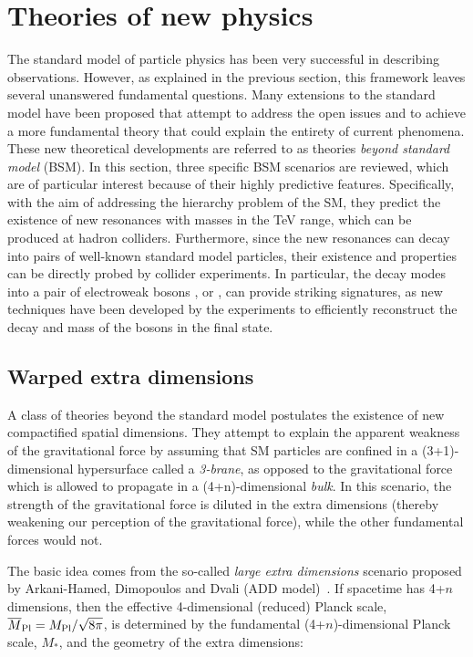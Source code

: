 \section{Theories of new physics}
\label{sec:BSMintro}

The standard model of particle physics has been very successful in describing observations. 
However, as explained in the previous section, this framework leaves several unanswered fundamental questions.
Many extensions to the standard model have been proposed that attempt to address the open issues and to achieve a more fundamental theory
that could explain the entirety of current phenomena.
These new theoretical developments are referred to as theories \textit{beyond standard model} (BSM).
In this section, three specific BSM scenarios are reviewed, which are of particular interest because of their highly predictive features.
Specifically, with the aim of addressing the hierarchy problem of the SM, they predict the existence of new resonances with masses in the TeV range,
which can be produced at hadron colliders.
Furthermore, since the new resonances can decay into pairs of well-known standard model particles, their existence and properties can be directly probed by collider experiments.
In particular, the decay modes into a pair of electroweak bosons \PW, \PZ or \PH, can provide striking signatures, as new techniques have been developed by the experiments to efficiently reconstruct the decay and mass of the bosons in the final state.

\subsection{Warped extra dimensions}\label{subsec:graviton}

A class of theories beyond the standard model postulates the existence of new compactified spatial dimensions.
They attempt to explain the apparent weakness of the gravitational force by assuming that SM particles are confined in a (3+1)-dimensional hypersurface called a \textit{3-brane},
as opposed to the gravitational force which is allowed to propagate in a (4+n)-dimensional \textit{bulk}.
In this scenario, the strength of the gravitational force is diluted in the extra dimensions (thereby weakening our perception of the gravitational force), while the other fundamental forces would not.

The basic idea comes from the so-called \textit{large extra dimensions} scenario proposed by Arkani-Hamed, Dimopoulos and Dvali (ADD model)~\cite{ArkaniHamed:1998rs}.
If spacetime has 4+$n$ dimensions, then the effective 4-dimensional (reduced) Planck scale, $\overline{M}_\mathrm{Pl} = M_\mathrm{Pl}/\sqrt{8\pi}$,
is determined by the fundamental (4+$n$)-dimensional Planck scale, $M_*$, and the geometry of the extra dimensions:

